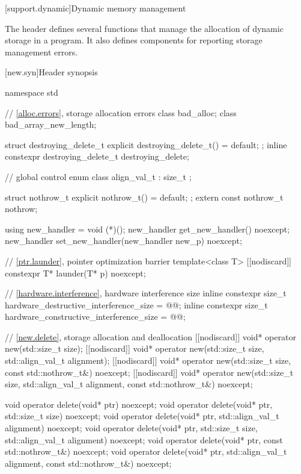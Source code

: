 
[support.dynamic]{Dynamic memory management}

\pnum
The header  defines several
functions that manage the allocation of dynamic storage in a program.
It also defines components for reporting storage management errors.

[new.syn]{Header  synopsis}
\begin{codeblock}
namespace std {
  // \ref{alloc.errors}, storage allocation errors
  class bad_alloc;
  class bad_array_new_length;

  struct destroying_delete_t {
    explicit destroying_delete_t() = default;
  };
  inline constexpr destroying_delete_t destroying_delete{};

  // global  control%
  enum class align_val_t : size_t {};

  struct nothrow_t { explicit nothrow_t() = default; };
  extern const nothrow_t nothrow;

  using new_handler = void (*)();
  new_handler get_new_handler() noexcept;
  new_handler set_new_handler(new_handler new_p) noexcept;

  // \ref{ptr.launder}, pointer optimization barrier
  template<class T> [[nodiscard]] constexpr T* launder(T* p) noexcept;

  // \ref{hardware.interference}, hardware interference size
  inline constexpr size_t hardware_destructive_interference_size = @\impdef{}@;
  inline constexpr size_t hardware_constructive_interference_size = @\impdef{}@;
}

// \ref{new.delete}, storage allocation and deallocation
[[nodiscard]] void* operator new(std::size_t size);
[[nodiscard]] void* operator new(std::size_t size, std::align_val_t alignment);
[[nodiscard]] void* operator new(std::size_t size, const std::nothrow_t&) noexcept;
[[nodiscard]] void* operator new(std::size_t size, std::align_val_t alignment,
                                 const std::nothrow_t&) noexcept;

void  operator delete(void* ptr) noexcept;
void  operator delete(void* ptr, std::size_t size) noexcept;
void  operator delete(void* ptr, std::align_val_t alignment) noexcept;
void  operator delete(void* ptr, std::size_t size, std::align_val_t alignment) noexcept;
void  operator delete(void* ptr, const std::nothrow_t&) noexcept;
void  operator delete(void* ptr, std::align_val_t alignment, const std::nothrow_t&) noexcept;


\end{codeblock}
